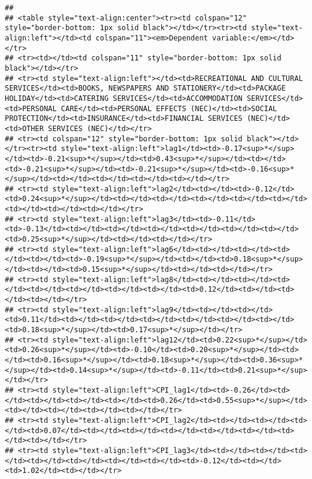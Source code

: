\documentclass[
]{article}
\begin{document}
\begin{verbatim}
## 
## <table style="text-align:center"><tr><td colspan="12" style="border-bottom: 1px solid black"></td></tr><tr><td style="text-align:left"></td><td colspan="11"><em>Dependent variable:</em></td></tr>
## <tr><td></td><td colspan="11" style="border-bottom: 1px solid black"></td></tr>
## <tr><td style="text-align:left"></td><td>RECREATIONAL AND CULTURAL SERVICES</td><td>BOOKS, NEWSPAPERS AND STATIONERY</td><td>PACKAGE HOLIDAY</td><td>CATERING SERVICES</td><td>ACCOMMODATION SERVICES</td><td>PERSONAL CARE</td><td>PERSONAL EFFECTS (NEC)</td><td>SOCIAL PROTECTION</td><td>INSURANCE</td><td>FINANCIAL SERVICES (NEC)</td><td>OTHER SERVICES (NEC)</td></tr>
## <tr><td colspan="12" style="border-bottom: 1px solid black"></td></tr><tr><td style="text-align:left">lag1</td><td>-0.17<sup>*</sup></td><td>-0.21<sup>*</sup></td><td>0.43<sup>*</sup></td><td></td><td>-0.21<sup>*</sup></td><td>-0.21<sup>*</sup></td><td>-0.16<sup>*</sup></td><td></td><td></td><td></td><td></td></tr>
## <tr><td style="text-align:left">lag2</td><td></td><td>-0.12</td><td>0.24<sup>*</sup></td><td></td><td></td><td></td><td></td><td></td><td></td><td></td><td></td></tr>
## <tr><td style="text-align:left">lag3</td><td>-0.11</td><td>-0.13</td><td></td><td></td><td></td><td></td><td></td><td></td><td>0.25<sup>*</sup></td><td></td><td></td></tr>
## <tr><td style="text-align:left">lag6</td><td></td><td></td><td></td><td></td><td>-0.19<sup>*</sup></td><td></td><td>0.18<sup>*</sup></td><td></td><td>0.15<sup>*</sup></td><td></td><td></td></tr>
## <tr><td style="text-align:left">lag8</td><td></td><td></td><td></td><td></td><td></td><td></td><td></td><td>0.12</td><td></td><td></td><td></td></tr>
## <tr><td style="text-align:left">lag9</td><td></td><td></td><td>0.11</td><td></td><td></td><td></td><td></td><td></td><td></td><td>0.18<sup>*</sup></td><td>0.17<sup>*</sup></td></tr>
## <tr><td style="text-align:left">lag12</td><td>0.22<sup>*</sup></td><td>0.26<sup>*</sup></td><td>-0.10</td><td>0.20<sup>*</sup></td><td></td><td>0.16<sup>*</sup></td><td>0.18<sup>*</sup></td><td>0.36<sup>*</sup></td><td>0.14<sup>*</sup></td><td>-0.11</td><td>0.21<sup>*</sup></td></tr>
## <tr><td style="text-align:left">CPI_lag1</td><td>-0.26</td><td></td><td></td><td></td><td></td><td>0.26</td><td>0.55<sup>*</sup></td><td></td><td></td><td></td><td></td></tr>
## <tr><td style="text-align:left">CPI_lag2</td><td></td><td></td><td></td><td>0.07</td><td></td><td></td><td></td><td></td><td></td><td></td><td></td></tr>
## <tr><td style="text-align:left">CPI_lag3</td><td></td><td></td><td></td><td></td><td></td><td></td><td></td><td>-0.12</td><td></td><td>1.02</td><td></td></tr>

\end{verbatim}
\end{document}
